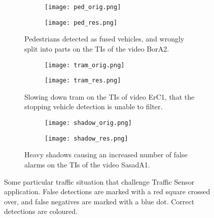 \begin{figure}[!h]
	\centering
		\begin{subfigure}[b]{0.8\textwidth}
			\centering
			\begin{subfigure}[b]{\textwidth}
				\texttt{[image: ped\_orig.png]}
			\end{subfigure}
			\hspace{20mm}%
			\begin{subfigure}[b]{\textwidth}
				\texttt{[image: ped\_res.png]}
			\end{subfigure}
		\caption{Pedestrians detected as fused vehicles, and wrongly split into parts on the TIs of the video BorA2. \label{fig:error_peds}}
		\end{subfigure}
		
		\hfill
		
		\begin{subfigure}[b]{0.8\textwidth}
			\centering
			\begin{subfigure}[b]{\textwidth}
				\texttt{[image: tram\_orig.png]}
			\end{subfigure}
					 \hspace{6mm}%
			\begin{subfigure}[b]{\textwidth}
				\texttt{[image: tram\_res.png]}
			\end{subfigure}
			\caption{Slowing down tram on the TIs of video ErC1, that the stopping vehicle detection is unable to filter. \label{fig:error_tram}}
		\end{subfigure}
	
		\hfill
		
		\begin{subfigure}[b]{0.8\textwidth}
			\centering
			\begin{subfigure}[b]{\textwidth}
				\texttt{[image: shadow\_orig.png]}
			\end{subfigure}
								 \hspace{6mm}%
			\begin{subfigure}[b]{\textwidth}
				\texttt{[image: shadow\_res.png]}
			\end{subfigure}
		\caption{Heavy shadows causing an increased number of false alarms on the TIs of the video SasadA1. \label{fig:error_shadows}}
		\end{subfigure}
		
		\caption{Some particular traffic situation that challenge Traffic Sensor application. False detections are marked with a red square crossed over, and false negatives are marked with a blue dot. Correct detections are coloured.\label{fig:errors}}

\end{figure}

